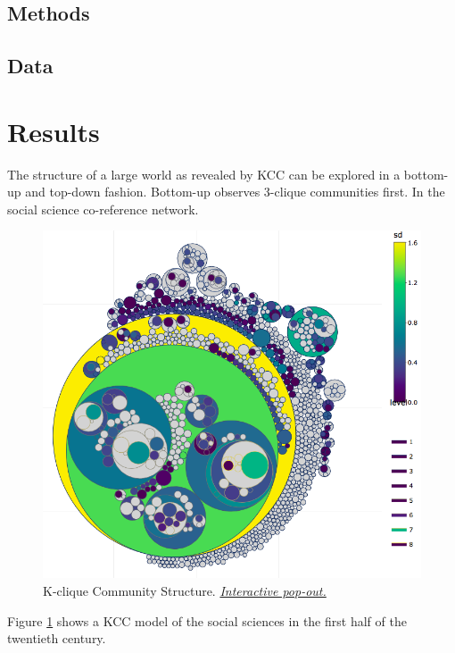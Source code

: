 \documentclass[]{book}
\theoremstyle{definition}
\theoremstyle{definition}
\theoremstyle{definition}
\theoremstyle{remark}
\begin{document}
\hypertarget{methods}{%
\subsection{Methods}\label{methods}}

\hypertarget{data-1}{%
\subsection{Data}\label{data-1}}

\hypertarget{results-2}{%
\section{Results}\label{results-2}}

The structure of a large world as revealed by KCC can be explored in a
bottom-up and top-down fashion. Bottom-up observes 3-clique communities
first. In the social science co-reference network.




\begin{figure}

{\centering \includegraphics[width=0.9\linewidth]{img/kcc2tree} 

}

\caption{K-clique Community Structure.
\href{exh/kcc2tree.html}{\emph{Interactive pop-out.}}}\label{fig:kcc2tree}
\end{figure}

Figure \ref{fig:kcc2tree} shows a KCC model of the social sciences in
the first half of the twentieth century.
\end{document}

